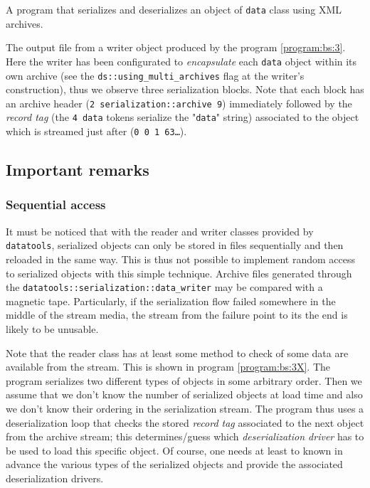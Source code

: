 \documentclass[a4paper,12pt]{article}
\newcommand{\basepath}{.}
\newcommand{\codingpath}{\basepath/coding}
\newcommand{\pn}{\par\noindent}
\newcommand{\TT}[1]{"\texttt{#1}"}
\begin{document}
\begin{program}[h]
\VerbatimInput[frame=single,
numbers=left,
numbersep=2pt,
firstline=1,
fontsize=\footnotesize,
showspaces=false]{\codingpath/data_3.cxx}
\caption{A program that serializes and deserializes an 
object of \texttt{data} class using XML archives.
}
\label{program:bs:3}
\end{program}

\begin{sample}[h]
\VerbatimInput[frame=single,
numbers=left,
numbersep=2pt,
firstline=1,
fontsize=\footnotesize,
showspaces=false]{\codingpath/data_3.txt.out}
\caption{The output file from a writer object produced by the program
  \ref{program:bs:3}. 
Here the writer has been configurated to \emph{encapsulate} each \texttt{data} object
within its own archive (see the \texttt{ds::using\_multi\_archives} flag at
 the writer's construction), thus we observe three serialization blocks. Note that each block
has an archive header (\texttt{2 serialization::archive 9}) 
immediately followed by the  \emph{record tag} (the \texttt{4 data} tokens serialize
the \TT{data} string) associated to the object which is streamed just after (\texttt{0 0 1 63\dots}).
}
\label{sample:bs:3}
\end{sample}
\clearpage

\subsection{Important remarks}

\subsubsection{Sequential access}

\pn  It  must be  noticed  that with  the  reader  and writer  classes
provided by \texttt{datatools}, serialized  objects can only be stored
in files sequentially and then reloaded  in the same way. This is thus
not  possible to implement  random access  to serialized  objects with
this   simple  technique.    Archive  files   generated   through  the
\texttt{datatools::serialization::data\_writer} may be compared with a
magnetic  tape.   Particularly,   if  the  serialization  flow  failed
somewhere  in the  middle of  the stream  media, the  stream  from the
failure point to its the end is likely to be unusable.


\pn Note  that the reader class has  at least some method  to check of
some  data are available  from the  stream. This  is shown  in program
\ref{program:bs:3X}.  The program  serializes two  different  types of
objects in  some arbitrary order.  Then  we assume that  we don't know
the number of  serialized objects at load time and  also we don't know
their ordering in  the serialization stream.  The program  thus uses a
deserialization  loop   that  checks  the   stored  \emph{record  tag}
associated  to   the  next  object  from  the   archive  stream;  this
determines/guess which \emph{deserialization driver} has to be used to
load this specific  object. Of course, one needs at  least to known in
advance the  various types of  the serialized objects and  provide the
associated deserialization drivers.
\end{document}
